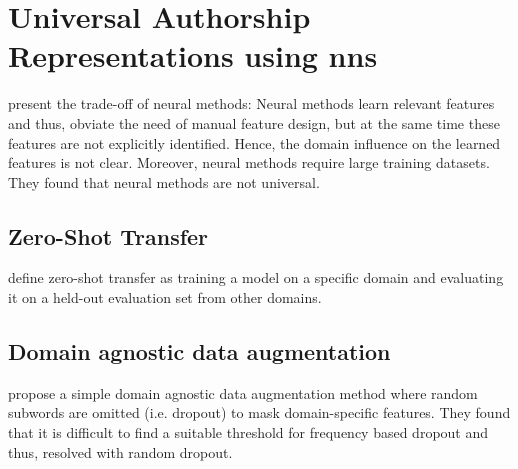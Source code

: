 \section{Universal Authorship Representations using \acp{nn}}
\label{sec:universal_authorship_representations}

\citet{rivera_soto_learning_2021} present the trade-off of neural methods:
Neural methods learn relevant features and thus, obviate the need of manual feature design, but 
at the same time these features are not explicitly identified.
Hence, the domain influence on the learned features is not clear.
Moreover, neural methods require large training datasets.
They found that neural methods are not universal.

\subsection{Zero-Shot Transfer}
\citet{rivera_soto_learning_2021} define zero-shot transfer as training a model on a specific domain and 
evaluating it on a held-out evaluation set from other domains. %

\subsection{Domain agnostic data augmentation}
\citet{rivera_soto_learning_2021} propose a simple domain agnostic data augmentation method where 
random subwords are omitted (i.e. dropout) to mask domain-specific features.
They found that it is difficult to find a suitable threshold for frequency based dropout and thus, 
resolved with random dropout.